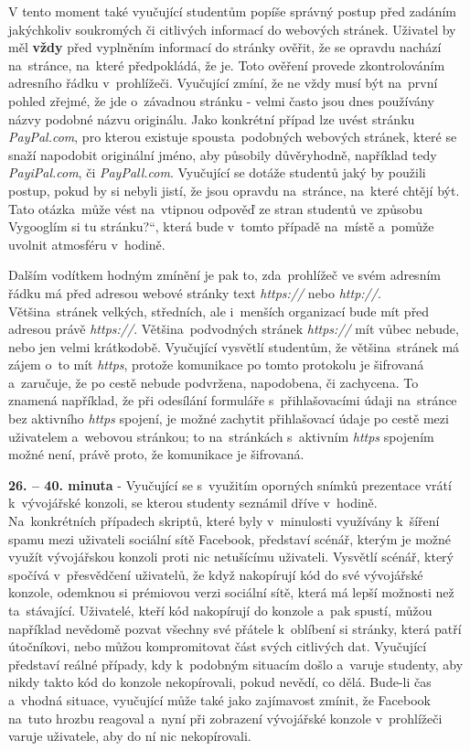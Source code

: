 \documentclass[a4paper, 12pt]{article}
\providecommand{\uv}[1]{\quotedblbase #1\textquotedblleft}
\begin{document}
V tento moment také vyučující studentům popíše správný postup před zadáním jakýchkoliv soukromých či citlivých informací do webových stránek. Uživatel by měl \textbf{vždy} před vyplněním informací do stránky ověřit, že se opravdu nachází na~stránce, na~které předpokládá, že je. Toto ověření provede zkontrolováním adresního řádku v~prohlížeči. Vyučující zmíní, že ne vždy musí být na~první pohled zřejmé, že jde o~závadnou stránku - velmi často jsou dnes používány názvy podobné názvu originálu. Jako konkrétní případ lze uvést stránku \textit{PayPal.com}, pro kterou existuje spousta~podobných webových stránek, které se snaží napodobit originální jméno, aby působily důvěryhodně, například tedy \textit{PayiPal.com}, či \textit{PayPall.com}. Vyučující se dotáže studentů jaký by použili postup, pokud by si nebyli jistí, že jsou opravdu na~stránce, na~které chtějí být. Tato otázka~může vést na~vtipnou odpověď ze stran studentů ve způsobu \uv{Vygooglím si tu stránku?}, která bude v~tomto případě na~místě a~pomůže uvolnit atmosféru v~hodině.

Dalším vodítkem hodným zmínění je pak to, zda~prohlížeč ve svém adresním řádku má před adresou webové stránky text \textit{https://} nebo \textit{http://}. Většina~stránek velkých, středních, ale i~menších organizací bude mít před adresou právě \textit{https://}. Většina~podvodných stránek \textit{https://} mít vůbec nebude, nebo jen velmi krátkodobě. Vyučující vysvětlí studentům, že většina~stránek má zájem o~to mít \textit{https}, protože komunikace po tomto protokolu je šifrovaná a~zaručuje, že po cestě nebude podvržena, napodobena, či zachycena. To znamená například, že při odesílání formuláře s~přihlašovacími údaji na~stránce bez aktivního \textit{https} spojení, je možné zachytit přihlašovací údaje po cestě mezi uživatelem a~webovou stránkou; to na~stránkách s~aktivním \textit{https} spojením možné není, právě proto, že komunikace je šifrovaná.

\textbf{26. -- 40. minuta} - Vyučující se s~využitím oporných snímků prezentace vrátí k~vývojářské konzoli, se kterou studenty seznámil dříve v~hodině. Na~konkrétních případech skriptů, které byly v~minulosti využívány k~šíření spamu mezi uživateli sociální sítě Facebook, představí scénář, kterým je možné využít vývojářskou konzoli proti nic netušícímu uživateli. Vysvětlí scénář, který spočívá v~přesvědčení uživatelů, že když nakopírují kód do své vývojářské konzole, odemknou si prémiovou verzi sociální sítě, která má lepší možnosti než ta~stávající. Uživatelé, kteří kód nakopírují do konzole a~pak spustí, můžou například nevědomě pozvat všechny své přátele k~oblíbení si stránky, která patří útočníkovi, nebo můžou kompromitovat část svých citlivých dat. Vyučující představí reálné případy, kdy k~podobným situacím došlo a~varuje studenty, aby nikdy takto kód do konzole nekopírovali, pokud nevědí, co dělá. Bude-li čas a~vhodná situace, vyučující může také jako zajímavost zmínit, že Facebook na~tuto hrozbu reagoval a~nyní při zobrazení vývojářské konzole v~prohlížeči varuje uživatele, aby do ní nic nekopírovali.
\end{document}
